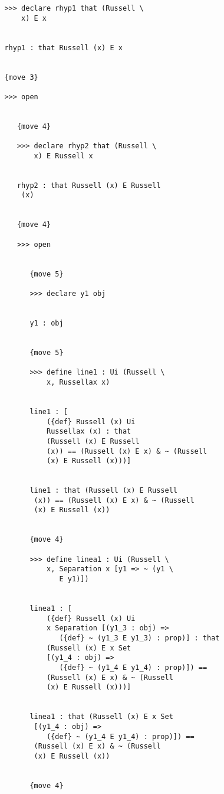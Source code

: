 \documentclass[12pt]{article}
\begin{document}
\begin{verbatim}
         >>> declare rhyp1 that (Russell \
             x) E x


         rhyp1 : that Russell (x) E x


         {move 3}

         >>> open


            {move 4}

            >>> declare rhyp2 that (Russell \
                x) E Russell x


            rhyp2 : that Russell (x) E Russell 
             (x)


            {move 4}

            >>> open


               {move 5}

               >>> declare y1 obj


               y1 : obj


               {move 5}

               >>> define line1 : Ui (Russell \
                   x, Russellax x)


               line1 : [
                   ({def} Russell (x) Ui 
                   Russellax (x) : that 
                   (Russell (x) E Russell 
                   (x)) == (Russell (x) E x) & ~ (Russell 
                   (x) E Russell (x)))]


               line1 : that (Russell (x) E Russell 
                (x)) == (Russell (x) E x) & ~ (Russell 
                (x) E Russell (x))


               {move 4}

               >>> define linea1 : Ui (Russell \
                   x, Separation x [y1 => ~ (y1 \
                      E y1)])


               linea1 : [
                   ({def} Russell (x) Ui 
                   x Separation [(y1_3 : obj) => 
                      ({def} ~ (y1_3 E y1_3) : prop)] : that 
                   (Russell (x) E x Set 
                   [(y1_4 : obj) => 
                      ({def} ~ (y1_4 E y1_4) : prop)]) == 
                   (Russell (x) E x) & ~ (Russell 
                   (x) E Russell (x)))]


               linea1 : that (Russell (x) E x Set 
                [(y1_4 : obj) => 
                   ({def} ~ (y1_4 E y1_4) : prop)]) == 
                (Russell (x) E x) & ~ (Russell 
                (x) E Russell (x))


               {move 4}


\end{verbatim}
\end{document}
